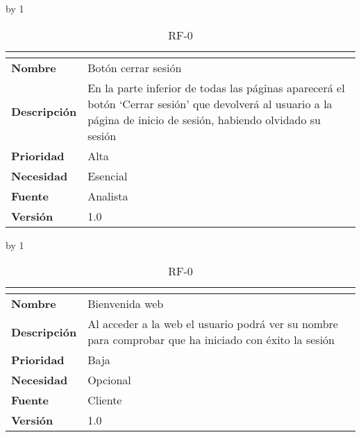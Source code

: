 \advance\rf by 1
\begin{table}[H]
	\caption{RF-0\number\rf}
	\begin{tabular}{|l|p{}|}
		\hline
		\multicolumn{2}{|c|}{\cellcolor[HTML]{BFBFBF}{\color[HTML]{000000} \textbf{RF-0\number\rf}}} \\ \hline
		\textbf{Nombre}      & Botón cerrar sesión                                                                                                                                                \\ \hline
		\textbf{Descripción} & En la parte inferior de todas las páginas aparecerá el botón ‘Cerrar sesión’ que devolverá al usuario a la página de inicio de sesión, habiendo olvidado su sesión \\ \hline
		\textbf{Prioridad}   & Alta                                                                                                                                                               \\ \hline
		\textbf{Necesidad}   & Esencial                                                                                                                                                           \\ \hline
		\textbf{Fuente}      & Analista                                                                                                                                                           \\ \hline
		\textbf{Versión}     & 1.0                                                                                                                                                                \\ \hline
	\end{tabular}
\end{table}
\advance\rf by 1
\begin{table}[H]
	\caption{RF-0\number\rf}
	\begin{tabular}{|l|p{}|}
		\hline
		\multicolumn{2}{|c|}{\cellcolor[HTML]{BFBFBF}{\color[HTML]{000000} \textbf{RF-0\number\rf}}} \\ \hline
		\textbf{Nombre}      & Bienvenida web                                                                                        \\ \hline
		\textbf{Descripción} & Al acceder a la web el usuario podrá ver su nombre para comprobar que ha iniciado con éxito la sesión \\ \hline
		\textbf{Prioridad}   & Baja                                                                                                  \\ \hline
		\textbf{Necesidad}   & Opcional                                                                                              \\ \hline
		\textbf{Fuente}      & Cliente                                                                                               \\ \hline
		\textbf{Versión}     & 1.0                                                                                                   \\ \hline
	\end{tabular}
\end{table}
